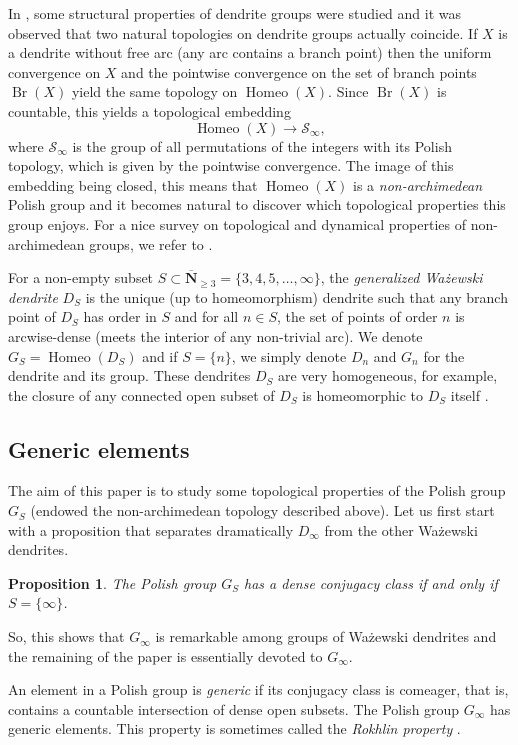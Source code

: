\documentclass[JEP,XML,SOM,Unicode,NoFloatCountersInSection]{cedram}
\let\mathcal\mathscr
\theoremstyle{plain}
\newtheorem{prop}[thm]{Proposition}
\theoremstyle{definition}
\newcommand{\NN}{\mathbf{N}}
\newcommand{\cS}{\mathcal{S}}
\newcommand{\sinf}{\cS_\infty}
\DeclareMathOperator{\Homeo}{Homeo}
\DeclareMathOperator{\Br}{Br}
\begin{document}
In \cite{DM_dendritesII}, some structural properties of dendrite groups were studied and it was observed that two natural topologies on dendrite groups actually coincide. If $X$ is a dendrite without free arc (\ie any arc contains a branch point) then the uniform convergence on $X$ and the pointwise convergence on the set of branch points $\Br(X)$ yield the same topology on $\Homeo(X)$. Since $\Br(X)$ is countable, this yields a topological embedding
\[
\Homeo(X)\to\sinf,
\]
where $\sinf$ is the group of all permutations of the integers with its Polish topology, which is given by the pointwise convergence. The image of this embedding being closed, this means that $\Homeo(X)$ is a \emph{non-archimedean} Polish group and it becomes natural to discover which topological properties this group enjoys. For a nice survey on topological and dynamical properties of non-archimedean groups, we refer to \cite{MR3469133}.

For a non-empty subset $S\subset\overline{\NN}_{\geq3}=\{3,4,5,\dots,\infty\}$, the \emph{generalized Wa\.zewski dendrite} $D_S$ is the unique (up to homeomorphism) dendrite such that any branch point of $D_S$ has order in $S$ and for all $n\in S$, the set of points of order $n$ is arcwise-dense (\ie meets the interior of any non-trivial arc). We denote $G_S=\Homeo(D_S)$ and if $S=\{n\}$, we simply denote $D_n$ and $G_n$ for the dendrite and its group. These dendrites $D_S$ are very homogeneous, for example, the closure of any connected open subset of $D_S$ is homeomorphic to $D_S$ itself \cite[Lem.\,2.14]{DM_dendritesII}.

\subsection{Generic elements} The aim of this paper is to study some topological properties of the Polish group $G_S$ (endowed the non-archimedean topology described above). Let us first start with a proposition that separates dramatically $D_{\infty}$ from the other Wa\.zewski dendrites.

\begin{prop} The Polish group $G_S$ has a dense conjugacy class if and only if $S=\{\infty\}$.
\end{prop}

So, this shows that $G_\infty$ is remarkable among groups of Wa\.zewski dendrites and the remaining of the paper is essentially devoted to $G_\infty$.

An element in a Polish group is \emph{generic} if its conjugacy class is comeager, that is, contains a countable intersection of dense open subsets. The Polish group $G_\infty$ has generic elements. This property is sometimes called the \emph{Rokhlin property} \cite{MR2353899}.
\end{document}
